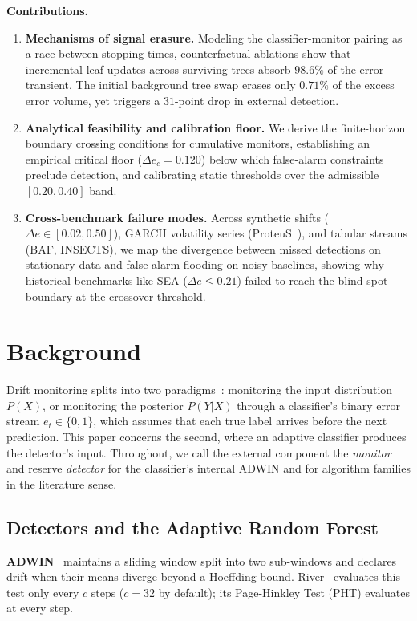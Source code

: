 \documentclass[10pt,conference]{IEEEtran}
\theoremstyle{definition}
\begin{document}
\smallskip
\noindent\textbf{Contributions.}
\begin{enumerate}[nosep, label=\textbf{(C\arabic*)}, start=1]
  \item \textbf{Mechanisms of signal erasure.} Modeling the classifier-monitor pairing as a race between stopping times, counterfactual ablations show that incremental leaf updates across surviving trees absorb $98.6\%$ of the error transient. The initial background tree swap erases only $0.71\%$ of the excess error volume, yet triggers a $31$-point drop in external detection.
  \item \textbf{Analytical feasibility and calibration floor.} We derive the finite-horizon boundary crossing conditions for cumulative monitors, establishing an empirical critical floor ($\Delta e_c = 0.120$) below which false-alarm constraints preclude detection, and calibrating static thresholds over the admissible $[0.20, 0.40]$ band.
  \item \textbf{Cross-benchmark failure modes.} Across synthetic shifts ($\Delta e \in [0.02, 0.50]$), GARCH volatility series (ProteuS~\cite{suarez_cetrulo_proteus_2025}), and tabular streams (BAF, INSECTS), we map the divergence between missed detections on stationary data and false-alarm flooding on noisy baselines, showing why historical benchmarks like SEA ($\Delta e \le 0.21$) failed to reach the blind spot boundary at the crossover threshold.
\end{enumerate}

\section{Background}\label{sec:background}

Drift monitoring splits into two paradigms~\cite{gama_survey_2014, lu_concept_drift_2018}: monitoring the input distribution $P(X)$, or monitoring the posterior $P(Y|X)$ through a classifier's binary error stream $e_t \in \{0,1\}$, which assumes that each true label arrives before the next prediction. This paper concerns the second, where an adaptive classifier produces the detector's input. Throughout, we call the external component the \emph{monitor} and reserve \emph{detector} for the classifier's internal ADWIN and for algorithm families in the literature sense.

\subsection{Detectors and the Adaptive Random Forest}\label{sec:adwin}
\textbf{ADWIN}~\cite{bifet_adwin_2007} maintains a sliding window split into two sub-windows and declares drift when their means diverge beyond a Hoeffding bound. River~\cite{montiel_river_2021} evaluates this test only every $c$ steps ($c=32$ by default); its Page-Hinkley Test (PHT) evaluates at every step.
\end{document}
